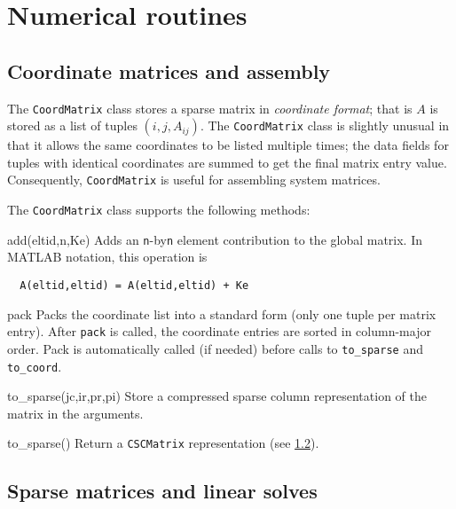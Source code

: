\documentclass{article}
\newenvironment{codelist}[1][\quad]%
  {\begin{list}{}{%
   \settowidth{\labelwidth}{\texttt{#1}\hfil}%
   \setlength{\leftmargin}{\labelwidth}%
   \addtolength{\leftmargin}{\labelsep}%
   \addtolength{\leftmargin}{\parindent}%
   \renewcommand{\makelabel}[1]{\texttt{##1}}}}%
  {\end{list}}
\newcommand{\ttt}[1]{\texttt{#1}}
\begin{document}
\section{Numerical routines}


\subsection{Coordinate matrices and assembly}
\label{section-sparse-assembly}

The \ttt{CoordMatrix} class stores a sparse matrix in
\emph{coordinate format}; that is $A$ is stored as a list of tuples
$(i, j, A_{ij})$.  The \ttt{CoordMatrix} class is slightly unusual
in that it allows the same coordinates to be listed multiple times;
the data fields for tuples with identical coordinates are summed to
get the final matrix entry value.  Consequently, \ttt{CoordMatrix}
is useful for assembling system matrices.

The \ttt{CoordMatrix} class supports the following methods:
\begin{codelist}

  \item[add(eltid,n,Ke)] 
    Adds an \ttt{n}-by\ttt{n} element contribution to the global
    matrix.  In MATLAB notation, this operation is
    \begin{verbatim}
  A(eltid,eltid) = A(eltid,eltid) + Ke
    \end{verbatim}

  \item[pack]
    Packs the coordinate list into a standard form (only one tuple per
    matrix entry).  After \ttt{pack} is called, the coordinate
    entries are sorted in column-major order.  Pack is automatically
    called (if needed) before calls to \ttt{to\_sparse} and
    \ttt{to\_coord}.
    
  \item[to\_sparse(jc,ir,pr,pi)]
    Store a compressed sparse column representation of the matrix in
    the arguments.  

  \item[to\_sparse()]
    Return a \ttt{CSCMatrix} representation (see \ref{section-cscmatrix}).

\end{codelist}


\subsection{Sparse matrices and linear solves}
\label{section-cscmatrix}
\end{document}
